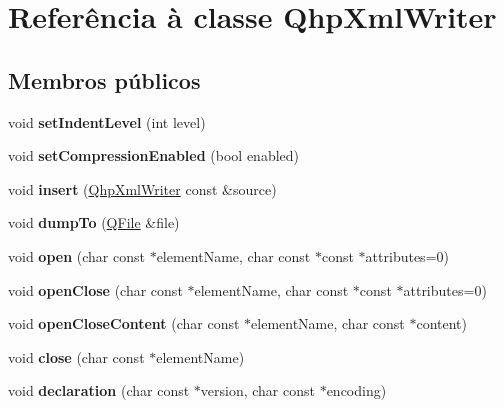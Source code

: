 \hypertarget{class_qhp_xml_writer}{\section{Referência à classe Qhp\-Xml\-Writer}
\label{class_qhp_xml_writer}
}
\subsection*{Membros públicos}
\begin{DoxyCompactItemize}
\item 
\hypertarget{class_qhp_xml_writer_ad3fc309b78e89256839223c734ec6d40}{void {\bfseries set\-Indent\-Level} (int level)}\label{class_qhp_xml_writer_ad3fc309b78e89256839223c734ec6d40}

\item 
\hypertarget{class_qhp_xml_writer_af099b43b6470017d8a64de7a920dc592}{void {\bfseries set\-Compression\-Enabled} (bool enabled)}\label{class_qhp_xml_writer_af099b43b6470017d8a64de7a920dc592}

\item 
\hypertarget{class_qhp_xml_writer_a35f461f38ca8433fbfc37b31e8569c87}{void {\bfseries insert} (\hyperlink{class_qhp_xml_writer}{Qhp\-Xml\-Writer} const \&source)}\label{class_qhp_xml_writer_a35f461f38ca8433fbfc37b31e8569c87}

\item 
\hypertarget{class_qhp_xml_writer_a4d8b20560bf05cce21609787da46adcd}{void {\bfseries dump\-To} (\hyperlink{class_q_file}{Q\-File} \&file)}\label{class_qhp_xml_writer_a4d8b20560bf05cce21609787da46adcd}

\item 
\hypertarget{class_qhp_xml_writer_a72b257857cb47ada177b7519ecbeaef8}{void {\bfseries open} (char const $\ast$element\-Name, char const $\ast$const $\ast$attributes=0)}\label{class_qhp_xml_writer_a72b257857cb47ada177b7519ecbeaef8}

\item 
\hypertarget{class_qhp_xml_writer_ac9c74bae215dda11987a4110796b759d}{void {\bfseries open\-Close} (char const $\ast$element\-Name, char const $\ast$const $\ast$attributes=0)}\label{class_qhp_xml_writer_ac9c74bae215dda11987a4110796b759d}

\item 
\hypertarget{class_qhp_xml_writer_ad63a90ca0c506902a5f76c66a362f97f}{void {\bfseries open\-Close\-Content} (char const $\ast$element\-Name, char const $\ast$content)}\label{class_qhp_xml_writer_ad63a90ca0c506902a5f76c66a362f97f}

\item 
\hypertarget{class_qhp_xml_writer_adf506e2ddfce11bd02832e59251962bf}{void {\bfseries close} (char const $\ast$element\-Name)}\label{class_qhp_xml_writer_adf506e2ddfce11bd02832e59251962bf}

\item 
\hypertarget{class_qhp_xml_writer_a6dd31b46a13b9276deb5f0772ab198f2}{void {\bfseries declaration} (char const $\ast$version, char const $\ast$encoding)}\label{class_qhp_xml_writer_a6dd31b46a13b9276deb5f0772ab198f2}

\end{DoxyCompactItemize}
